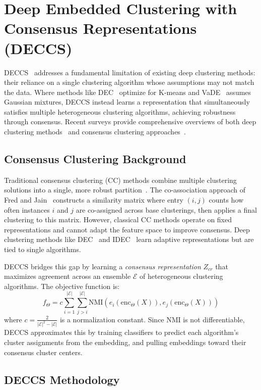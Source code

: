 \section{Deep Embedded Clustering with Consensus Representations (DECCS)}

DECCS~\citep{Miklautz2022} addresses a fundamental limitation of existing deep clustering methods: their reliance on a single clustering algorithm whose assumptions may not match the data. Where methods like DEC~\citep{Xie2016} optimize for K-means and VaDE~\citep{Jiang2017} assumes Gaussian mixtures, DECCS instead learns a representation that simultaneously satisfies multiple heterogeneous clustering algorithms, achieving robustness through consensus. Recent surveys provide comprehensive overviews of both deep clustering methods~\citep{Min2018, Zhou2024} and consensus clustering approaches~\citep{Vega-Pons2011}.

\subsection{Consensus Clustering Background}

Traditional consensus clustering (CC) methods combine multiple clustering solutions into a single, more robust partition~\citep{Strehl2002, Fred2005}. The co-association approach of Fred and Jain~\citep{Fred2005} constructs a similarity matrix where entry $(i,j)$ counts how often instances $i$ and $j$ are co-assigned across base clusterings, then applies a final clustering to this matrix. However, classical CC methods operate on fixed representations and cannot adapt the feature space to improve consensus. Deep clustering methods like DEC~\citep{Xie2016} and IDEC~\citep{Guo2017} learn adaptive representations but are tied to single algorithms.

DECCS bridges this gap by learning a \emph{consensus representation} $Z_{cr}$ that maximizes agreement across an ensemble $\mathcal{E}$ of heterogeneous clustering algorithms. The objective function is:
\[
    f_{\Theta} = c \sum_{i=1}^{|\mathcal{E}|} \sum_{j>i}^{|\mathcal{E}|} \text{NMI}(e_i(\text{enc}_\Theta(X)), e_j(\text{enc}_\Theta(X)))
\]
where $c = \frac{2}{|\mathcal{E}|^2 - |\mathcal{E}|}$ is a normalization constant. Since NMI is not differentiable, DECCS approximates this by training classifiers to predict each algorithm's cluster assignments from the embedding, and pulling embeddings toward their consensus cluster centers.

\subsection{DECCS Methodology}

